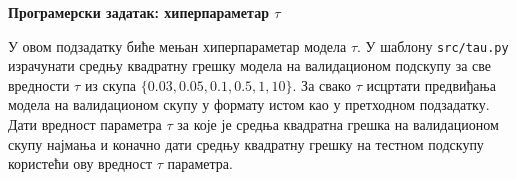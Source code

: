 \item {} {\bf Програмерски задатак: хиперпараметар $\tau$}

У овом подзадатку биће мењан хиперпараметар модела $\tau$. У шаблону \verb|src/tau.py| израчунати средњу квадратну грешку модела на валидационом подскупу за све вредности $\tau$ из скупа $\{0.03, 0.05, 0.1, 0.5, 1, 10\}$. За свако $\tau$ исцртати предвиђања модела на валидационом скупу у формату истом као у претходном подзадатку. Дати вредност параметра $\tau$ за које је средња квадратна грешка на валидационом скупу најмања и коначно дати средњу квадратну грешку на тестном подскупу користећи ову вредност $\tau$ параметра.

